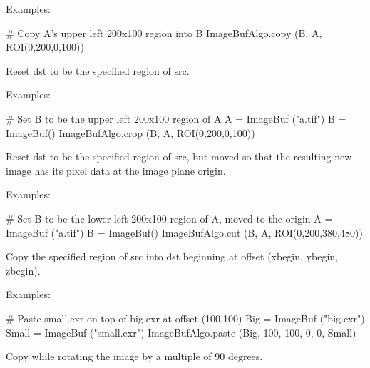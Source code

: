 \smallskip
\noindent Examples:
\begin{code}
    # Copy A's upper left 200x100 region into B
    ImageBufAlgo.copy (B, A, ROI(0,200,0,100))
\end{code}
\apiend


 
Reset {\cf dst} to be the specified region of {\cf src}.

\smallskip
\noindent Examples:
\begin{code}
    # Set B to be the upper left 200x100 region of A
    A = ImageBuf ("a.tif")
    B = ImageBuf()
    ImageBufAlgo.crop (B, A, ROI(0,200,0,100))
\end{code}
\apiend


 
Reset {\cf dst} to be the specified region of {\cf src}, but moved so
that the resulting new image has its pixel data at the image plane origin.

\smallskip
\noindent Examples:
\begin{code}
    # Set B to be the lower left 200x100 region of A, moved to the origin
    A = ImageBuf ("a.tif")
    B = ImageBuf()
    ImageBufAlgo.cut (B, A, ROI(0,200,380,480))
\end{code}
\apiend


 
Copy the specified region of {\cf src} into {\cf dst} beginning at 
offset {\cf (xbegin, ybegin, zbegin)}.

\smallskip
\noindent Examples:
\begin{code}
    # Paste small.exr on top of big.exr at offset (100,100)
    Big = ImageBuf ("big.exr")
    Small = ImageBuf ("small.exr")
    ImageBufAlgo.paste (Big, 100, 100, 0, 0, Small)
\end{code}
\apiend


 
 
 
Copy while rotating the image by a multiple of 90 degrees.

